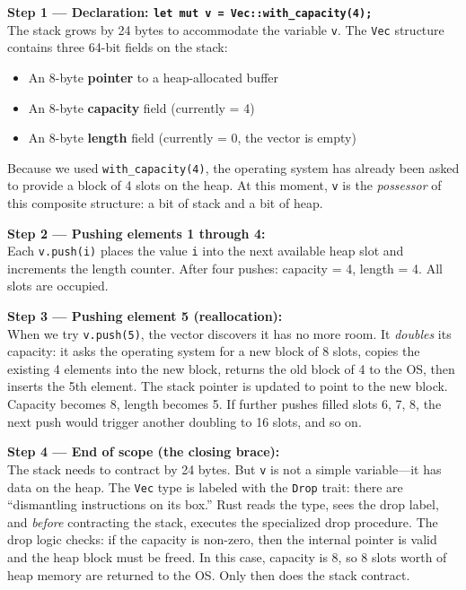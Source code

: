 \begin{memoryblock}
\textbf{Step 1 --- Declaration: \texttt{let mut v = Vec::with\_capacity(4);}} \\
The stack grows by 24 bytes to accommodate the variable \texttt{v}. The \texttt{Vec} structure contains three 64-bit fields on the stack:
\begin{itemize}
    \item An 8-byte \textbf{pointer} to a heap-allocated buffer
    \item An 8-byte \textbf{capacity} field (currently = 4)
    \item An 8-byte \textbf{length} field (currently = 0, the vector is empty)
\end{itemize}
Because we used \texttt{with\_capacity(4)}, the operating system has already been asked to provide a block of 4 slots on the heap. At this moment, \texttt{v} is the \emph{possessor} of this composite structure: a bit of stack and a bit of heap.

\textbf{Step 2 --- Pushing elements 1 through 4:} \\
Each \texttt{v.push(i)} places the value \texttt{i} into the next available heap slot and increments the length counter. After four pushes: capacity = 4, length = 4. All slots are occupied.

\textbf{Step 3 --- Pushing element 5 (reallocation):} \\
When we try \texttt{v.push(5)}, the vector discovers it has no more room. It \emph{doubles} its capacity: it asks the operating system for a new block of 8 slots, copies the existing 4 elements into the new block, returns the old block of 4 to the OS, then inserts the 5th element. The stack pointer is updated to point to the new block. Capacity becomes 8, length becomes 5. If further pushes filled slots 6, 7, 8, the next push would trigger another doubling to 16 slots, and so on.

\textbf{Step 4 --- End of scope (the closing brace):} \\
The stack needs to contract by 24 bytes. But \texttt{v} is not a simple variable---it has data on the heap. The \texttt{Vec} type is labeled with the \texttt{Drop} trait: there are ``dismantling instructions on its box.'' Rust reads the type, sees the drop label, and \emph{before} contracting the stack, executes the specialized drop procedure. The drop logic checks: if the capacity is non-zero, then the internal pointer is valid and the heap block must be freed. In this case, capacity is 8, so 8 slots worth of heap memory are returned to the OS. Only then does the stack contract.
\end{memoryblock}


